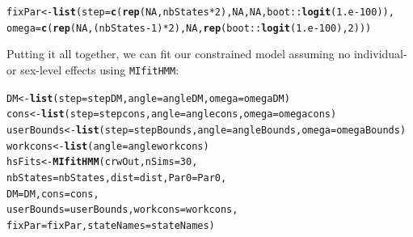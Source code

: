 \documentclass[12pt]{article}\usepackage[]{graphicx}\usepackage[]{color}
\makeatletter
\newcommand{\hlnum}[1]{\textcolor[rgb]{0.686,0.059,0.569}{#1}}%
\newcommand{\hlopt}[1]{\textcolor[rgb]{0,0,0}{#1}}%
\newcommand{\hlstd}[1]{\textcolor[rgb]{0.345,0.345,0.345}{#1}}%
\newcommand{\hlkwb}[1]{\textcolor[rgb]{0.69,0.353,0.396}{#1}}%
\newcommand{\hlkwc}[1]{\textcolor[rgb]{0.333,0.667,0.333}{#1}}%
\newcommand{\hlkwd}[1]{\textcolor[rgb]{0.737,0.353,0.396}{\textbf{#1}}}%
\newenvironment{kframe}{%
 \def\at@end@of@kframe{}%
 \ifinner\ifhmode%
  \def\at@end@of@kframe{\end{minipage}}%
  \begin{minipage}{\columnwidth}%
 \fi\fi%
 \def\FrameCommand##1{\hskip\@totalleftmargin \hskip-\fboxsep
 \colorbox{shadecolor}{##1}\hskip-\fboxsep
     \hskip-\linewidth \hskip-\@totalleftmargin \hskip\columnwidth}%
 \MakeFramed {\advance\hsize-\width
   \@totalleftmargin\z@ \linewidth\hsize
   \@setminipage}}%
 {\par\unskip\endMakeFramed%
 \at@end@of@kframe}
\newenvironment{knitrout}{}{} %
\makeatother
\begin{document}
\begin{knitrout}
\color{fgcolor}\begin{kframe}
\begin{alltt}
\hlstd{fixPar} \hlkwb{<-} \hlkwd{list}\hlstd{(}\hlkwc{step}\hlstd{=}\hlkwd{c}\hlstd{(}\hlkwd{rep}\hlstd{(}\hlnum{NA}\hlstd{,nbStates}\hlopt{*}\hlnum{2}\hlstd{),}\hlnum{NA}\hlstd{,}\hlnum{NA}\hlstd{,boot}\hlopt{::}\hlkwd{logit}\hlstd{(}\hlnum{1.e-100}\hlstd{)),}
             \hlkwc{omega}\hlstd{=}\hlkwd{c}\hlstd{(}\hlkwd{rep}\hlstd{(}\hlnum{NA}\hlstd{,(nbStates}\hlopt{-}\hlnum{1}\hlstd{)}\hlopt{*}\hlnum{2}\hlstd{),}\hlnum{NA}\hlstd{,}\hlkwd{rep}\hlstd{(boot}\hlopt{::}\hlkwd{logit}\hlstd{(}\hlnum{1.e-100}\hlstd{),}\hlnum{2}\hlstd{)))}
\end{alltt}
\end{kframe}
\end{knitrout}
Putting it all together, we can fit our constrained model assuming no individual- or sex-level effects using \verb|MIfitHMM|:
\begin{knitrout}
\color{fgcolor}\begin{kframe}
\begin{alltt}
\hlstd{DM} \hlkwb{<-} \hlkwd{list}\hlstd{(}\hlkwc{step} \hlstd{= stepDM,} \hlkwc{angle} \hlstd{= angleDM,} \hlkwc{omega} \hlstd{= omegaDM)}
\hlstd{cons} \hlkwb{<-} \hlkwd{list}\hlstd{(}\hlkwc{step} \hlstd{= stepcons,} \hlkwc{angle} \hlstd{= anglecons,} \hlkwc{omega} \hlstd{= omegacons)}
\hlstd{userBounds} \hlkwb{<-} \hlkwd{list}\hlstd{(}\hlkwc{step} \hlstd{= stepBounds,} \hlkwc{angle} \hlstd{= angleBounds,} \hlkwc{omega} \hlstd{= omegaBounds)}
\hlstd{workcons} \hlkwb{<-} \hlkwd{list}\hlstd{(}\hlkwc{angle} \hlstd{= angleworkcons)}
\hlstd{hsFits} \hlkwb{<-} \hlkwd{MIfitHMM}\hlstd{(crwOut,} \hlkwc{nSims} \hlstd{=} \hlnum{30}\hlstd{,}
                   \hlkwc{nbStates} \hlstd{= nbStates,} \hlkwc{dist} \hlstd{= dist,} \hlkwc{Par0} \hlstd{= Par0,}
                   \hlkwc{DM} \hlstd{= DM,} \hlkwc{cons} \hlstd{= cons,}
                   \hlkwc{userBounds} \hlstd{= userBounds,} \hlkwc{workcons} \hlstd{= workcons,}
                   \hlkwc{fixPar} \hlstd{= fixPar,} \hlkwc{stateNames} \hlstd{= stateNames)}
\end{alltt}
\end{kframe}
\end{knitrout}
\end{document}
